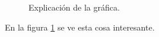 \documentclass{article}
\begin{document}
\begin{figure}
\begin{center}
\scalebox{0.8}{}
\end{center}
\caption{Explicaci\'{o}n de la gr\'{a}fica.}
\label{fig:ejemplo}
\end{figure}

En la figura \ref{fig:ejemplo} se ve esta cosa interesante.
\end{document}
